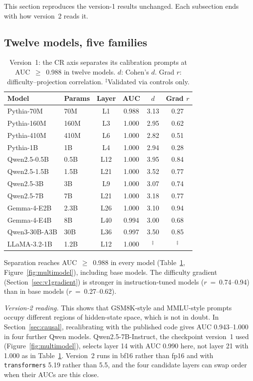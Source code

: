 \documentclass[11pt]{article}
\begin{document}
This section reproduces the version-1 results unchanged. Each subsection ends with how version~2 reads it.

\subsection{Twelve models, five families}

\begin{table}[ht]
\caption{Version~1: the CR axis separates its calibration prompts at AUC~$\geq$~0.988 in twelve models. $d$: Cohen's $d$. Grad $r$: difficulty--projection correlation. $^\ddagger$Validated via controls only.}
\label{tab:models}
\vspace{4pt}
\centering
\small
\begin{tabular}{@{}llcccc@{}}
\toprule
Model & Params & Layer & AUC & $d$ & Grad $r$ \\
\midrule
Pythia-70M & 70M & L1 & 0.988 & 3.13 & 0.27 \\
Pythia-160M & 160M & L3 & 1.000 & 2.95 & 0.62 \\
Pythia-410M & 410M & L6 & 1.000 & 2.82 & 0.51 \\
Pythia-1B & 1B & L4 & 1.000 & 2.94 & 0.28 \\
\midrule
Qwen2.5-0.5B & 0.5B & L12 & 1.000 & 3.95 & 0.84 \\
Qwen2.5-1.5B & 1.5B & L21 & 1.000 & 3.52 & 0.77 \\
Qwen2.5-3B & 3B & L9 & 1.000 & 3.07 & 0.74 \\
Qwen2.5-7B & 7B & L21 & 1.000 & 3.18 & 0.77 \\
\midrule
Gemma-4-E2B & 2.3B & L26 & 1.000 & 3.10 & 0.94 \\
Gemma-4-E4B & 8B & L40 & 0.994 & 3.00 & 0.68 \\
\midrule
Qwen3-30B-A3B & 30B & L36 & 0.997 & 3.50 & 0.85 \\
\midrule
LLaMA-3.2-1B & 1.2B & L12 & 1.000 & $^\ddagger$ & $^\ddagger$ \\
\bottomrule
\end{tabular}
\end{table}

Separation reaches AUC~$\geq$~0.988 in every model (Table~\ref{tab:models}, Figure~\ref{fig:multimodel}), including base models. The difficulty gradient (Section~\ref{sec:v1gradient}) is stronger in instruction-tuned models ($r$~=~0.74--0.94) than in base models ($r$~=~0.27--0.62).

\textit{Version-2 reading.} This shows that GSM8K-style and MMLU-style prompts occupy different regions of hidden-state space, which is not in doubt. In Section~\ref{sec:causal}, recalibrating with the published code gives AUC 0.943--1.000 in four further Qwen models. Qwen2.5-7B-Instruct, the checkpoint version~1 used (Figure~\ref{fig:multimodel}), selects layer 14 with AUC 0.990 here, not layer 21 with 1.000 as in Table~\ref{tab:models}. Version~2 runs in bf16 rather than fp16 and with \texttt{transformers} 5.19 rather than 5.5, and the four candidate layers can swap order when their AUCs are this close.
\end{document}

